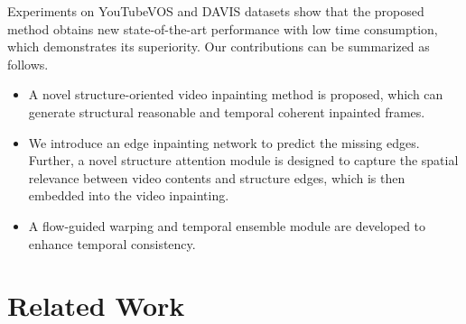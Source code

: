 Experiments on YouTubeVOS and DAVIS datasets show that the proposed method obtains new state-of-the-art performance with low time consumption, which demonstrates its superiority.
Our contributions can be summarized as follows.
\begin{itemize}
	\item A novel structure-oriented video inpainting method is proposed, which can generate structural reasonable and temporal coherent inpainted frames.
	
	\item We introduce an edge inpainting network to predict the missing edges. Further, a novel structure attention module is designed to capture the spatial relevance between video contents and structure edges, which is then embedded into the video inpainting. %
	\item A flow-guided warping and temporal ensemble module are developed to enhance temporal consistency.
	
	
	
\end{itemize}





\section{Related Work}